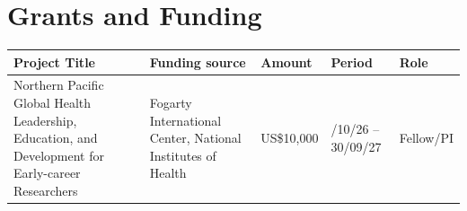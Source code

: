\section{Grants and Funding}
{\renewcommand{\arraystretch}{1.2}
\begin{longtable}{|>{\raggedright\arraybackslash}m{4.5cm}
                  |>{\raggedright\arraybackslash}m{\dimexpr\linewidth-4.5cm-1.75cm-1.75cm-2.25cm-10\tabcolsep-6\arrayrulewidth\relax}
                  |>{\centering\arraybackslash}m{1.75cm}
                  |>{\centering\arraybackslash}m{1.75cm}
                  |>{\centering\arraybackslash}m{2.25cm}|}
\hline
\rowcolor{black!15}
\centering\textbf{Project Title} & \centering\textbf{Funding source} & \textbf{Amount} & \textbf{Period} & \textbf{Role} \\ \hline
\endhead
Northern Pacific Global Health Leadership, Education, and Development for Early-career Researchers & Fogarty International Center, National Institutes of Health & US\$10,000 & 01/10/26 -- 30/09/27 & Fellow/PI \\ \hline
\end{longtable}}
